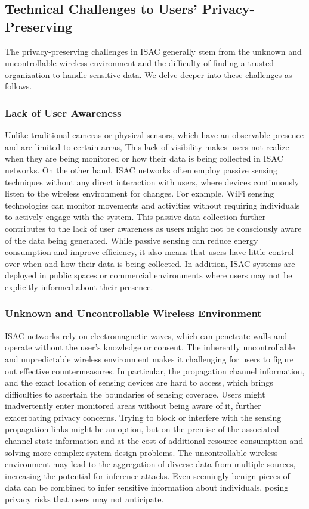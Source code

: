 \documentclass[10pt,journal,twocolumn,twoside]{IEEEtran} %
\begin{document}
\subsection{Technical Challenges to Users' Privacy-Preserving}
The privacy-preserving challenges in ISAC generally stem from the unknown and uncontrollable wireless environment and the difficulty of finding a trusted organization to handle sensitive data. We delve deeper into these challenges as follows.
\subsubsection{Lack of User Awareness}
Unlike traditional cameras or physical sensors, which have an observable presence and are limited to certain areas, This lack of visibility makes users not realize when they are being monitored or how their data is being collected in ISAC networks. On the other hand, ISAC networks often employ passive sensing techniques without any direct interaction with users, where devices continuously listen to the wireless environment for changes. For example, WiFi sensing technologies can monitor movements and activities without requiring individuals to actively engage with the system. This passive data collection further contributes to the lack of user awareness as users might not be consciously aware of the data being generated. While passive sensing can reduce energy consumption and improve efficiency, it also means that users have little control over when and how their data is being collected. In addition, ISAC systems are deployed in public spaces or commercial environments where users may not be explicitly informed about their presence. 
\subsubsection{Unknown and Uncontrollable Wireless Environment}
 ISAC networks rely on electromagnetic waves, which can penetrate walls and operate without the user's knowledge or consent. The inherently uncontrollable and unpredictable wireless environment makes it challenging for users to figure out effective countermeasures. In particular, the propagation channel information, and the exact location of sensing devices are hard to access, which brings difficulties to ascertain the boundaries of sensing coverage. Users might inadvertently enter monitored areas without being aware of it, further exacerbating privacy concerns. Trying to block or interfere with the sensing propagation links might be an option, but on the premise of the associated channel state information and at the cost of additional resource consumption and solving more complex system design problems. The uncontrollable wireless environment may lead to the aggregation of diverse data from multiple sources, increasing the potential for inference attacks. Even seemingly benign pieces of data can be combined to infer sensitive information about individuals, posing privacy risks that users may not anticipate.
\end{document}
